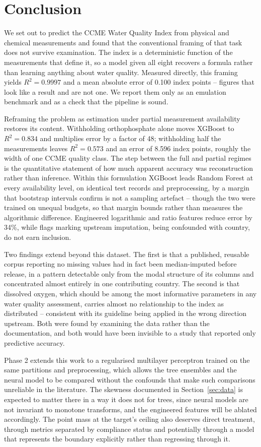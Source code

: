 \section{Conclusion}
\label{sec:conclusion}

We set out to predict the CCME Water Quality Index from physical and chemical
measurements and found that the conventional framing of that task does not survive
examination. The index is a deterministic function of the measurements that define it, so
a model given all eight recovers a formula rather than learning anything about water
quality. Measured directly, this framing yields $R^2 = 0.9997$ and a mean absolute error
of 0.100 index points -- figures that look like a result and are not one. We report them
only as an emulation benchmark and as a check that the pipeline is sound.

Reframing the problem as estimation under partial measurement availability restores its
content. Withholding orthophosphate alone moves XGBoost to $R^2 = 0.834$ and multiplies
error by a factor of 48; withholding half the measurements leaves $R^2 = 0.573$ and an
error of 8.596 index points, roughly the width of one CCME quality class. The step
between the full and partial regimes is the quantitative statement of how much apparent
accuracy was reconstruction rather than inference. Within this formulation XGBoost leads Random
Forest at every availability level, on identical test records and preprocessing, by a
margin that bootstrap intervals confirm is not a sampling artefact -- though the two were
trained on unequal budgets, so that margin bounds rather than measures the algorithmic
difference. Engineered
logarithmic and ratio features reduce error by 34\%, while flags marking upstream
imputation, being confounded with country, do not earn inclusion.

Two findings extend beyond this dataset. The first is that a published, reusable corpus
reporting no missing values had in fact been median-imputed before release, in a pattern
detectable only from the modal structure of its columns and concentrated almost entirely
in one contributing country. The second is that dissolved oxygen, which should be among
the most informative parameters in any water quality assessment, carries almost no
relationship to the index as distributed -- consistent with its guideline being applied in
the wrong direction upstream. Both were found by examining the data rather than the
documentation, and both would have been invisible to a study that reported only
predictive accuracy.

Phase 2 extends this work to a regularised multilayer perceptron trained on the same
partitions and preprocessing, which allows the tree ensembles and the neural model to be
compared without the confounds that make such comparisons unreliable in the literature.
The skewness documented in Section~\ref{sec:data} is expected to matter there in a way it
does not for trees, since neural models are not invariant to monotone transforms, and the
engineered features will be ablated accordingly. The point mass at the target's ceiling also
deserves direct treatment, through metrics separated by compliance status and potentially
through a model that represents the boundary explicitly rather than regressing through
it.
